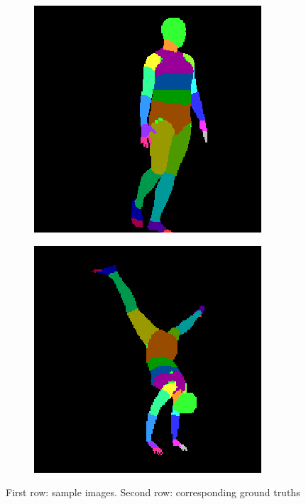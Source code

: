 \begin{figure}
\begin{subfigure}{.19\textwidth}
\end{subfigure}
\begin{subfigure}{.19\textwidth}
  \centering
  \includegraphics[scale=0.3]{ung_91_62_c0003_segm_87.png}
\end{subfigure}
\begin{subfigure}{.19\textwidth}
  \centering
  \includegraphics[scale=0.3]{ung_144_02_c0006_segm_2.png}
\end{subfigure}

\caption{First row: sample images. Second row: corresponding ground truths}
\label{dataset:samples}
\end{figure}
